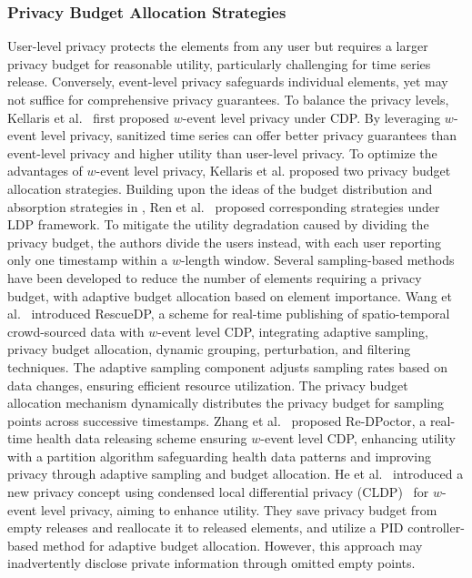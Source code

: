 \subsubsection{Privacy Budget Allocation Strategies}
User-level privacy protects the elements from any user but requires a larger privacy budget for reasonable utility, particularly challenging for time series release. Conversely, event-level privacy safeguards individual elements, yet may not suffice for comprehensive privacy guarantees. To balance the privacy levels,  
Kellaris et al.~\cite{Kellaris14} first proposed $w$-event level privacy under CDP. By leveraging $w$-event level privacy, sanitized time series can offer better privacy guarantees than event-level privacy and higher utility than user-level privacy. To optimize the advantages of $w$-event level privacy, Kellaris et al. \cite{Kellaris14} proposed two privacy budget allocation strategies. Building upon the ideas of the budget distribution and absorption strategies in \cite{Kellaris14}, Ren et al.~\cite{ren2022ldp} proposed corresponding strategies under LDP framework. To mitigate the utility degradation caused by dividing the privacy budget, the authors divide the users instead, with each user reporting only one timestamp within a $w$-length window. 
Several sampling-based methods have been developed to reduce the number of elements requiring a privacy budget, with adaptive budget allocation based on element importance. 
Wang et al.~\cite{wang2016rescuedp} introduced RescueDP, a scheme for real-time publishing of spatio-temporal crowd-sourced data with $w$-event level CDP, integrating adaptive sampling, privacy budget allocation, dynamic grouping, perturbation, and filtering techniques. The adaptive sampling component adjusts sampling rates based on data changes, ensuring efficient resource utilization. The privacy budget allocation mechanism dynamically distributes the privacy budget for sampling points across successive timestamps. Zhang et al.~\cite{zhang2017re} proposed Re-DPoctor, a real-time health data releasing scheme ensuring $w$-event level CDP, enhancing utility with a partition algorithm safeguarding health data patterns and improving privacy through adaptive sampling and budget allocation.
He et al.~\cite{he2022ordinal} introduced a new privacy concept using condensed local differential privacy (CLDP)~\cite{gursoy2019secure} for $w$-event level privacy, aiming to enhance utility. They save privacy budget from empty releases and reallocate it to released elements, and utilize a PID controller-based method for adaptive budget allocation. However, this approach may inadvertently disclose private information through omitted empty points.

